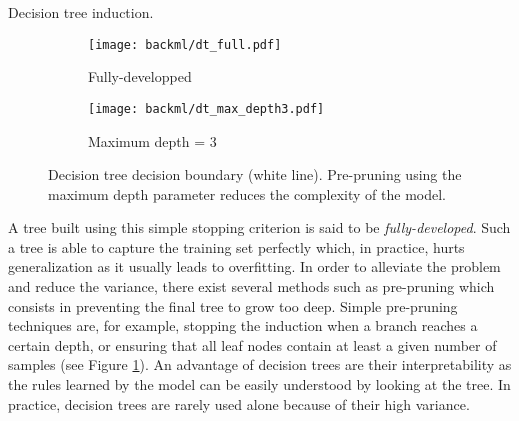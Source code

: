 \begin{algorithm}[t]
  \SetAlgoLined

  \;
\caption{Decision tree induction.}
\label{algo:backml:dtinduction}
\end{algorithm}

\begin{figure}
  \centering
  \begin{subfigure}[t]{0.48\textwidth}
    \centering
    \texttt{[image: backml/dt\_full.pdf]}
    \caption{Fully-developped}
  \end{subfigure}
  \begin{subfigure}[t]{0.48\textwidth}
    \centering
    \texttt{[image: backml/dt\_max\_depth3.pdf]}
    \caption{Maximum depth = 3}
  \end{subfigure}
  \caption{Decision tree decision boundary (white line). Pre-pruning using the maximum depth parameter reduces the complexity of the model.}
  \label{fig:backml:dt_boundary}
\end{figure}

A tree built using this simple stopping criterion is said to be \textit{fully-developed}.
Such a tree is able to capture the training set perfectly which, in practice,
hurts generalization as it usually leads to overfitting. In order to alleviate
the problem and reduce the variance, there exist several methods such as pre-pruning
which consists in preventing the final tree to grow too deep. Simple pre-pruning
techniques are, for example, stopping the induction when a branch reaches a certain
depth, or ensuring that all leaf nodes contain at least a given number of samples
(see Figure \ref{fig:backml:dt_boundary}). An advantage of decision trees are
their interpretability as the rules learned by the model can be easily understood
by looking at the tree. In practice, decision trees are rarely used alone because
of their high variance.

